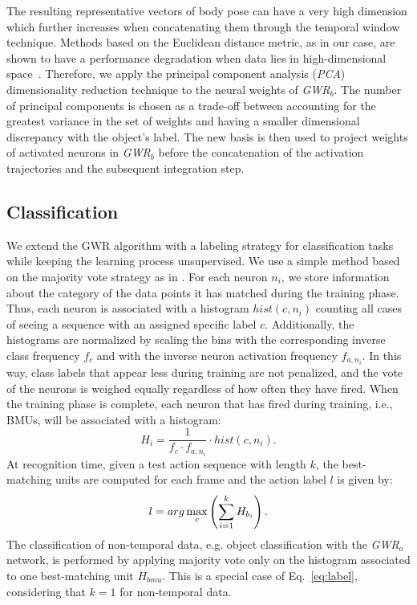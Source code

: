\documentclass[5p,times]{elsarticle}
\begin{document}
The resulting representative vectors of body pose can have a very high dimension which further increases when concatenating them through the temporal window technique. 
Methods based on the Euclidean distance metric, as in our case, are shown to have a performance degradation when data lies in high-dimensional space~\citep{aggarwal2001surprising}.
Therefore, we apply the principal component analysis (\textit{PCA}) dimensionality reduction technique to the neural weights of \textit{GWR}$_b$.
The number of principal components is chosen as a trade-off between accounting for the greatest variance in the set of weights and having a smaller dimensional discrepancy with the object's label.
The new basis is then used to project weights of activated neurons in \textit{GWR}$_b$ before the concatenation of the activation trajectories and the subsequent integration step.

\subsection{Classification}\label{subsec:classification}

We extend the GWR algorithm with a labeling strategy for classification tasks while keeping the learning process unsupervised.
We use a simple method based on the majority vote strategy as in \cite{strickert2005merge}. 
For each neuron $n_i$, we store information about the category of the data points it has matched during the training phase.
Thus, each neuron is associated with a histogram $hist(c, n_i)$ counting all cases of seeing a sequence with an assigned specific label $c$.
Additionally, the histograms are normalized by scaling the bins with the corresponding inverse class frequency $f_c$ and with the inverse neuron activation frequency $f_{a,n_i}$.
In this way, class labels that appear less during training are not penalized, and the vote of the neurons is weighed equally regardless of how often they have fired.
When the training phase is complete, each neuron that has fired during training, i.e., BMUs, will be associated with a histogram:
\begin{equation}
H_i = \frac{1}{f_c \cdot f_{a, n_i}} \cdot hist(c, n_i).
\end{equation}
At recognition time, given a test action sequence with length $k$, the best-matching units are computed for each frame and the action label $l$ is given by:
\begin{equation}\label{eq:label}
l = arg \operatornamewithlimits{max}\limits_{c} \left( \sum_{i=1}^{k} H_{b_i} \right).
\end{equation}
\noindent The classification of non-temporal data, e.g. object classification with the \textit{GWR}$_o$ network, is performed by applying majority vote only on the histogram associated to one best-matching unit $H_{bmu}$. 
This is a special case of Eq.~\ref{eq:label}, considering that $k=1$ for non-temporal data.
\end{document}
